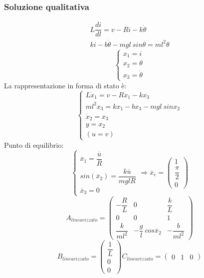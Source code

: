 \documentclass[a4paper]{report}
\begin{document}
\subsubsection{Soluzione qualitativa}
\[
  \begin{array}{l}
    L \dfrac{di}{dl} = v - Ri - k \dot{\theta}\\
    ki - b \dot{\theta} - mgl~sin{\theta} = m l^2 \theta
  \end{array}
\]
\[
  \left\{
  \begin{array}{l}
    x_1 = i\\
    x_2 = \theta\\
    x_3 = \dot{\theta}
  \end{array}
  \right .
\]
La rappresentazione in forma di stato \`e: 
\[
  \left\{
  \begin{array}{l}
    L \dot{x}_1 = v - Rx_1 - kx_3\\
    m l^2 x_3 = kx_1 - bx_3 - mgl~sinx_2\\
    \dot{x}_2 = x_3\\
    y = x_2\\
    (u = v)
  \end{array}
  \right .
\]
Punto di equilibrio:
\[
  \left\{
  \begin{array}{l}
    \overline{x}_1 = \dfrac{\overline{u}}{R}\\
    sin(\overline{x}_2) = \dfrac{k \overline{u}}{mglR}\\
    \overline{x}_3 = 0
  \end{array}
  \right .
  \Rightarrow
  \overline{x}_e = 
        \begin{pmatrix}
        1\\
        \dfrac{\pi}{2}\\
        0
        \end{pmatrix}
\]
\[
  A_{linearizzato} = 
  \begin{pmatrix}
    -\dfrac{R}{L} & 0 & \dfrac{k}{L}\\
    0 & 0 & 1\\
  \dfrac{k}{ml^2} & -\dfrac{g}{l}~cos\overline{x}_2 & -\dfrac{b}{ml^2}
  \end{pmatrix}
\]
\[
  B_{linearizzato} =
  \begin{pmatrix}
    \dfrac{1}{L}\\
    0\\
    0
  \end{pmatrix}
  C_{linearizzato} =
  \begin{pmatrix}
    0 & 1 & 0
  \end{pmatrix}
\]
\end{document}
